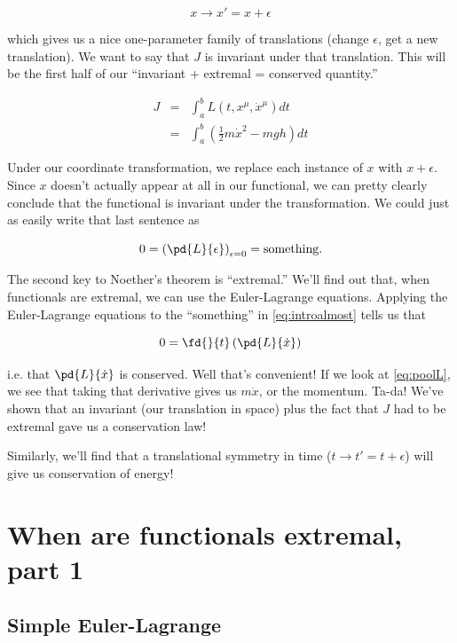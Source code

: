 \documentclass[12pt]{article}
\newcommand{\coord}{x}
\newcommand{\xd}{\dot{\coord}}
\newcommand{\xmu}{\coord^\mu}
\newcommand{\xdmu}{\xd^\mu}
\numberwithin{equation}{section}
\begin{document}
\begin{equation}
  \coord \to \coord' = \coord + \epsilon
\end{equation}

which gives us a nice one-parameter family of translations (change
$\epsilon$, get a new translation). We want to say that $J$ is
invariant under that translation. This will be the first half of our
``invariant + extremal = conserved quantity.'' 

\begin{eqnarray}
  J & =& \int_a^b L(t,\xmu,\xdmu)dt\\
    & =&  \int_a^b \left(\frac{1}{2}m\xd^2 - mgh \right)dt
\end{eqnarray}

Under our coordinate transformation, we replace each instance of
$\coord$ with $\coord + \epsilon$. Since $\coord$ doesn't actually
appear at all in our functional, we can pretty clearly conclude that
the functional is invariant under the transformation. We could just as
easily write that last sentence as

\begin{equation}
  \label{eq:introalmost}
  0 = \left(\pd{L}{\epsilon}\right)_{\epsilon=0} = \textrm{something.}
\end{equation}

The second key to Noether's theorem is ``extremal.'' We'll find out
that, when functionals are extremal, we can use the Euler-Lagrange
equations. Applying the Euler-Lagrange equations to the ``something''
in \eqref{eq:introalmost} tells us that 

\begin{equation}
  0 = \fd{}{t}\left(\pd{L}{\xd}\right)
\end{equation}

\noindent i.e. that $\pd{L}{\xd}$ is conserved. Well that's
convenient! If we look at \eqref{eq:poolL}, we see that taking that
derivative gives us $m\xd$, or the momentum. Ta-da! We've shown that
an invariant (our translation in space) plus the fact that $J$ had to
be extremal gave us a conservation law!

Similarly, we'll find that a translational symmetry in time ($t \to t'
= t + \epsilon$) will give us conservation of energy!

\section{When are functionals extremal, part 1}
\subsection{Simple Euler-Lagrange}
\label{sec:simple-el}
\end{document}
